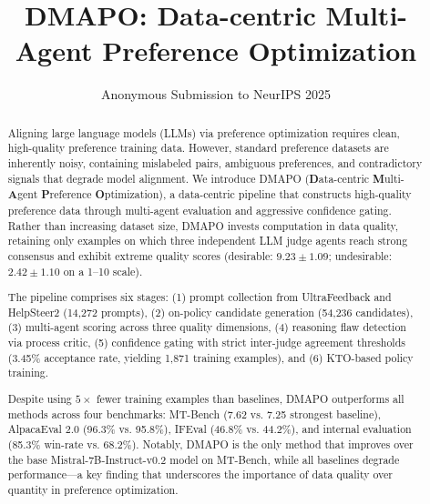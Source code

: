 \documentclass{article}
\title{DMAPO: Data-centric Multi-Agent Preference Optimization}
\author{
  Anonymous Submission to NeurIPS 2025
}
\newcommand{\ours}{\textsc{DMAPO}}
\begin{document}
\maketitle


\begin{abstract}
%
Aligning large language models (LLMs) via preference optimization requires clean, high-quality preference training data.
However, standard preference datasets are inherently noisy, containing mislabeled pairs, ambiguous preferences, and contradictory signals that degrade model alignment.
We introduce \ours{} (\textbf{D}ata-centric \textbf{M}ulti-\textbf{A}gent \textbf{P}reference \textbf{O}ptimization), a data-centric pipeline that constructs high-quality preference data through multi-agent evaluation and aggressive confidence gating.
Rather than increasing dataset size, \ours{} invests computation in data quality, retaining only examples on which three independent LLM judge agents reach strong consensus and exhibit extreme quality scores (desirable: $9.23 \pm 1.09$; undesirable: $2.42 \pm 1.10$ on a 1--10 scale).

The pipeline comprises six stages: (1) prompt collection from UltraFeedback and HelpSteer2 (14,272 prompts), (2) on-policy candidate generation (54,236 candidates), (3) multi-agent scoring across three quality dimensions, (4) reasoning flaw detection via process critic, (5) confidence gating with strict inter-judge agreement thresholds (3.45\% acceptance rate, yielding 1,871 training examples), and (6) KTO-based policy training.

Despite using $5\times$ fewer training examples than baselines, \ours{} outperforms all methods across four benchmarks: MT-Bench (7.62 vs. 7.25 strongest baseline), AlpacaEval 2.0 (96.3\% vs. 95.8\%), IFEval (46.8\% vs. 44.2\%), and internal evaluation (85.3\% win-rate vs. 68.2\%).
Notably, \ours{} is the only method that improves over the base Mistral-7B-Instruct-v0.2 model on MT-Bench, while all baselines degrade performance---a key finding that underscores the importance of data quality over quantity in preference optimization.

%
\end{abstract}

\end{document}
